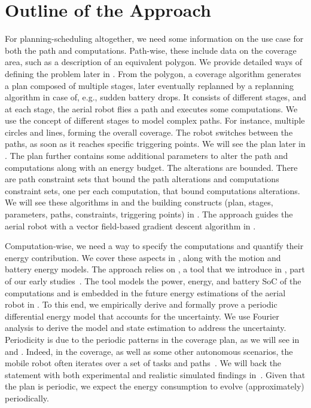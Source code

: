 \section{Outline of the Approach}
\label{sec:outline}

For planning-scheduling altogether, we need some information on the use case for both the path and computations. Path-wise, these include data on the coverage area, such as a description of an equivalent polygon. We provide detailed ways of defining the problem later in . From the polygon, a coverage algorithm generates a plan composed of multiple stages, later eventually replanned by a replanning algorithm in case of, e.g., sudden battery drops. It consists of different stages, and at each stage, the aerial robot flies a path and executes some computations. We use the concept of different stages to model complex paths. For instance, multiple circles and lines, forming the overall coverage. The robot switches between the paths, as soon as it reaches specific triggering points. We will see the plan later in . The plan further contains some additional parameters to alter the path and computations along with an energy budget. The alterations are bounded. There are path constraint sets that bound the path alterations and computations constraint sets, one per each computation, that bound computations alterations. We will see these algorithms in  and the building constructs (plan, stages, parameters, paths, constraints, triggering points) in . The approach guides the aerial robot with a vector field-based gradient descent algorithm in . 

Computation-wise, we need a way to specify the computations and quantify their energy contribution. We cover these aspects in , along with the motion and battery energy models. The approach relies on \powprof{}, a tool that we introduce in , part of our early studies~\citep{seewald2019component,seewald2019coarse}. The tool models the power, energy, and battery SoC of the computations and is embedded in the future energy estimations of the aerial robot in . To this end, we empirically derive and formally prove a periodic differential energy model that accounts for the uncertainty. We use Fourier analysis to derive the model and state estimation to address the uncertainty. Periodicity is due to the periodic patterns in the coverage plan, as we will see in  and . Indeed, in the coverage, as well as some other autonomous scenarios, the mobile robot often iterates over a set of tasks and paths~\citep{seewald2020mechanical,seewald202Xenergy}. We will back the statement with both experimental and realistic simulated findings in~. Given that the plan is periodic, we expect the energy consumption to evolve (approximately) periodically.

